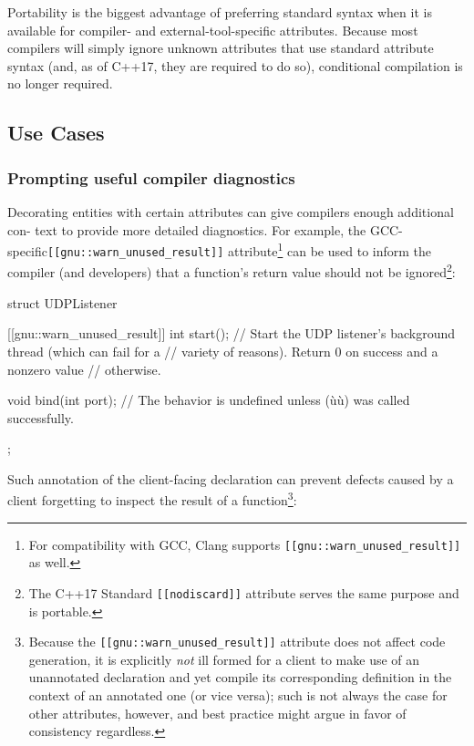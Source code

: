 Portability is the biggest advantage of preferring standard syntax when it is available for compiler- and external-tool-specific attributes. Because most compilers will simply ignore unknown attributes that use standard attribute syntax (and, as of C++17, they are required to do so), conditional compilation is no longer required.

\subsection[Use Cases]{Use Cases}\label{attribute-use-cases}

\subsubsection[Prompting useful compiler diagnostics]{Prompting useful compiler diagnostics}\label{eliciting-useful-compiler-diagnostics}

Decorating entities with certain attributes can give compilers enough
additional con-\linebreak %
text to provide more detailed diagnostics. For example,
the GCC-specific\linebreak[4] \lstinline![[gnu::warn_unused_result]]!
attribute{\cprotect\footnote{For compatibility with GCC,
Clang supports \lstinline![[gnu::warn_unused_result]]! as
  well.}} can be used to inform the compiler (and developers) that a
function's return value should not be ignored{\cprotect\footnote{The
C++17 Standard \lstinline![[nodiscard]]! attribute serves the same
  purpose and is portable.}}:

\begin{emcppslisting}[emcppsbatch=e5]
struct UDPListener
{
    [[gnu::warn_unused_result]] int start();
        // Start the UDP listener's background thread (which can fail for a
        // variety of reasons). Return 0 on success and a nonzero value
        // otherwise.

    void bind(int port);
        // The behavior is undefined unless (ù{}ù) was called successfully.
};
\end{emcppslisting}
\pagebreak%

\noindent Such annotation of the client-facing declaration can prevent defects
caused by a client forgetting to inspect the result of a
function{\cprotect\footnote{Because the
\lstinline![[gnu::warn_unused_result]]! attribute does not affect code
generation, it is explicitly \emph{not} ill formed for a client to
make use of an unannotated declaration and yet compile its
corresponding definition in the context of an annotated one (or vice
versa); such is not always the case for other attributes, however, and
  best practice might argue in favor of consistency regardless.}}:


